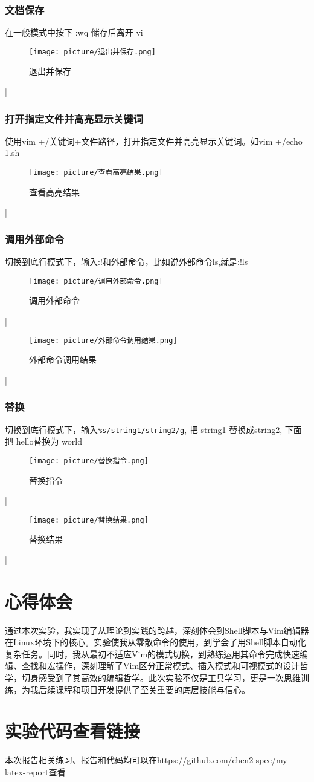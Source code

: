 \documentclass[UTF8]{ctexart}
\begin{document}
\subsubsection{文档保存}
在一般模式中按下 :wq 储存后离开 vi
\begin{figure}[H]
    \centering
    \texttt{[image: picture/退出并保存.png]}
    \caption{退出并保存}
\end{figure}|


\subsubsection{打开指定文件并高亮显示关键词}
使用vim +/关键词+文件路径，打开指定文件并高亮显示关键词。如vim +/echo 1.sh
\begin{figure}[H]
    \centering
    \texttt{[image: picture/查看高亮结果.png]}
    \caption{查看高亮结果}
\end{figure}|

\subsubsection{调用外部命令}
切换到底行模式下，输入:!和外部命令，比如说外部命令ls,就是:!ls
\begin{figure}[H]
    \centering
    \texttt{[image: picture/调用外部命令.png]}
    \caption{调用外部命令}
    
\end{figure}|\begin{figure}[H]
    \centering
    \texttt{[image: picture/外部命令调用结果.png]}
    \caption{外部命令调用结果}
\end{figure}|


\subsubsection{替换}
切换到底行模式下，输入\verb|%s/string1/string2/g|, 把 string1 替换成string2, 下面把 hello替换为 world
\begin{figure}[H]
    \centering
    \texttt{[image: picture/替换指令.png]}
    \caption{替换指令}
    
\end{figure}|\begin{figure}[H]
    \centering
    \texttt{[image: picture/替换结果.png]}
    \caption{替换结果}
\end{figure}|
\section{心得体会}
通过本次实验，我实现了从理论到实践的跨越，深刻体会到Shell脚本与Vim编辑器在Linux环境下的核心。实验使我从零散命令的使用，到学会了用Shell脚本自动化复杂任务。同时，我从最初不适应Vim的模式切换，到熟练运用其命令完成快速编辑、查找和宏操作，深刻理解了Vim区分正常模式、插入模式和可视模式的设计哲学，切身感受到了其高效的编辑哲学。此次实验不仅是工具学习，更是一次思维训练，为我后续课程和项目开发提供了至关重要的底层技能与信心。


\section{实验代码查看链接}
本次报告相关练习、报告和代码均可以在https://github.com/chen2-spec/my-latex-report查看
\end{document}
